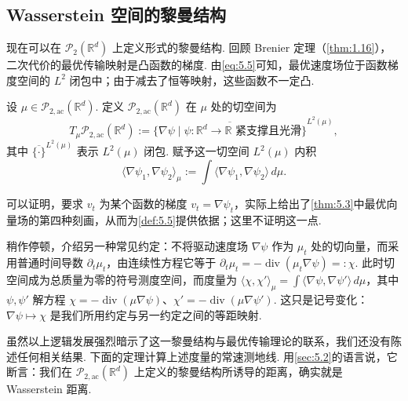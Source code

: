 \subsection{Wasserstein 空间的黎曼结构}\label{sec:5.3}

现在可以在 $\mathcal P_2(\mathbb R^d)$ 上定义形式的黎曼结构. 回顾 Brenier 定理（\autoref{thm:1.16}），二次代价的最优传输映射是凸函数的梯度. 由\eqref{eq:5.5}可知，最优速度场位于函数梯度空间的 $L^2$ 闭包中；由于减去了恒等映射，这些函数不一定凸.

\begin{definition}\label{def:5.5}
设 $\mu\in\mathcal P_{2,\mathrm{ac}}(\mathbb R^d)$. 定义 $\mathcal P_{2,\mathrm{ac}}(\mathbb R^d)$ 在 $\mu$ 处的切空间为
$$
T_\mu\mathcal P_{2,\mathrm{ac}}(\mathbb R^d)
:=\overline{\{\nabla\psi\mid\psi:\mathbb R^d\to\mathbb R\text{ 紧支撑且光滑}\}}^{L^2(\mu)},
$$
其中 $\overline{\{\cdot\}}^{L^2(\mu)}$ 表示 $L^2(\mu)$ 闭包. 赋予这一切空间 $L^2(\mu)$ 内积
$$
\langle\nabla\psi_1,\nabla\psi_2\rangle_\mu
:=\int\langle\nabla\psi_1,\nabla\psi_2\rangle\,d\mu.
$$
\end{definition}

可以证明，要求 $v_t$ 为某个函数的梯度 $v_t=\nabla\psi_t$，实际上给出了\autoref{thm:5.3}中最优向量场的第四种刻画，从而为\autoref{def:5.5}提供依据；这里不证明这一点.

\begin{remark}\label{rem:5.6}
稍作停顿，介绍另一种常见约定：不将驱动速度场 $\nabla\psi$ 作为 $\mu_t$ 处的切向量，而采用普通时间导数 $\partial_t\mu_t$，由连续性方程它等于 $\partial_t\mu_t=-\operatorname{div}(\mu_t\nabla\psi)=:\chi$. 此时切空间成为总质量为零的符号测度空间，而度量为 $\langle\chi,\chi'\rangle_\mu=\int\langle\nabla\psi,\nabla\psi'\rangle\,d\mu$，其中 $\psi,\psi'$ 解方程 $\chi=-\operatorname{div}(\mu\nabla\psi)$、$\chi'=-\operatorname{div}(\mu\nabla\psi')$. 这只是记号变化：$\nabla\psi\mapsto\chi$ 是我们所用约定与另一约定之间的等距映射.
\end{remark}

虽然以上逻辑发展强烈暗示了这一黎曼结构与最优传输理论的联系，我们还没有陈述任何相关结果. 下面的定理计算上述度量的常速测地线. 用\autoref{sec:5.2}的语言说，它断言：我们在 $\mathcal P_{2,\mathrm{ac}}(\mathbb R^d)$ 上定义的黎曼结构所诱导的距离，确实就是 Wasserstein 距离.

